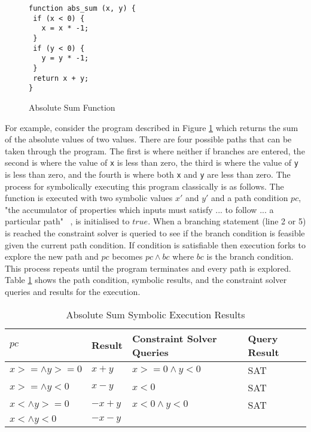\documentclass[]{final_report}
\begin{document}
\begin{figure}[h]
\begin{lstlisting}
function abs_sum (x, y) {
 if (x < 0) {
   x = x * -1;
 }
 if (y < 0) {
   y = y * -1;
 }
 return x + y;
}
\end{lstlisting}
\caption{\label{fig:abs-sum} Absolute Sum Function}
\end{figure} 

For example, consider the program described in Figure \ref{fig:abs-sum} which returns the sum of the absolute values of two values. There are four possible paths that can be taken through the program. The first is where neither if branches are entered, the second is where the value of \lstinline{x}  is less than zero, the third is where the value of \lstinline{y} is less than zero, and the fourth is where both \lstinline{x}  and \lstinline{y} are less than zero. The process for symbolically executing this program classically is as follows. The function is executed with two symbolic values $x'$ and $y'$ and a path condition $pc$, "the accumulator of properties which inputs must satisfy ... to follow ... a particular path" ~\cite{king1976symbolic}, is initialised to $true$. When a branching statement (line 2 or 5) is reached the constraint solver is queried to see if the branch condition is feasible given the current path condition. If condition is satisfiable then execution forks to explore the new path and $pc$ becomes $pc \land bc$  where $bc$ is the branch condition. This process repeats until the program terminates and every path is explored. Table \ref{abs-sum-se-table} shows the path condition, symbolic results, and the constraint solver queries and results for the execution.

\begin{table}[]
\centering
\begin{tabular}{|l|l|l|l|}
\hline
$pc$                & Result  & Constraint Solver Queries & Query Result \\ \hline
$x >= \land y >= 0$ & $x+y$   & $x >=0 \land y < 0 $      & SAT          \\ \hline
$x >= \land y < 0$  & $x - y$ & $x <0 $                   & SAT          \\ \hline
$x < \land y >= 0$  & $-x+y$  & $x<0 \land y < 0 $        & SAT          \\ \hline
$x < \land y < 0$   & $-x-y$  &                           &              \\ \hline
\end{tabular}
\caption{Absolute Sum Symbolic Execution Results}
\label{abs-sum-se-table}
\end{table}
\end{document}
